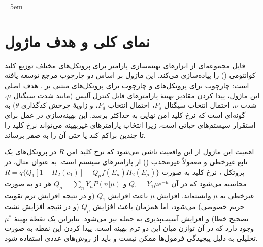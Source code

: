 \sloppy
\emergencystretch=5em

\section{نمای کلی و هدف ماژول}

فایل  مجموعه‌ای از ابزارهای بهینه‌سازی پارامتر برای پروتکل‌های مختلف توزیع کلید کوانتومی () را پیاده‌سازی می‌کند. این ماژول بر اساس دو چارچوب مرجع توسعه یافته است: چارچوب  برای پروتکل‌های  و چارچوب  برای پروتکل‌های  مبتنی بر . هدف اصلی این ماژول، پیدا کردن مقادیر بهینۀ پارامترهای قابل کنترل آلیس (مانند شدت سیگنال $\mu$، شدت  $\nu$، احتمال انتخاب سیگنال $P_s$، احتمال انتخاب  $P_d$، و زاویۀ چرخش کدگذاری $\theta$) به گونه‌ای است که نرخ کلید امن نهایی به حداکثر برسد. این بهینه‌سازی در عمل برای استقرار سیستم‌های  حیاتی است، زیرا انتخاب پارامترهای غیربهینه می‌تواند نرخ کلید را تا چندین براکم کند یا حتی آن را به صفر برساند.

اهمیت این ماژول از این واقعیت ناشی می‌شود که نرخ کلید امن $R$ در پروتکل‌های  یک تابع غیرخطی و معمولاً غیرمحدب () از پارامترهای سیستم است. به عنوان مثال، در پروتکل ، نرخ کلید به صورت $R = q\{Q_1[1 - H_2(e_1)] - Q_\mu f(E_\mu) H_2(E_\mu)\}$ محاسبه می‌شود که در آن $Q_1 = Y_1 \mu e^{-\mu}$ و $Q_\mu = \sum_n Y_n P(n|\mu)$ هر دو به صورت غیرخطی به $\mu$ وابسته‌اند. افزایش $\mu$ باعث افزایش $Q_1$ (و در نتیجه افزایش ترم تقویت حریم خصوصی) می‌شود، اما همزمان باعث افزایش $Q_\mu$ (و در نتیجه افزایش نشت تصحیح خطا) و افزایش آسیب‌پذیری به حمله  نیز می‌شود. بنابراین یک نقطۀ بهینۀ $\mu^*$ وجود دارد که در آن توازن میان این دو ترم بهینه است. پیدا کردن این نقطه به صورت تحلیلی به دلیل پیچیدگی فرمول‌ها ممکن نیست و باید از روش‌های عددی استفاده شود.

